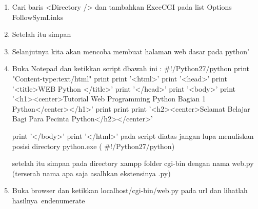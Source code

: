 \begin{enumerate}
\begin{enumerate}
	\item Cari baris <Directory /> dan tambahkan ExecCGI pada list Options FollowSymLinks  
	\item Setelah itu simpan 
	\item Selanjutnya kita akan mencoba membuat halaman web dasar pada python’ 
	\item Buka Notepad dan ketikkan script dbawah ini : 
	$  \#  $!/Python27/python 
	print "Content-type:text/html"
	print 
	print '<html>' 
	print '<head>' 
	print '<title>WEB Python </title>' 
	print '</head>' 
	print '<body>' 
	print '<h1><center>Tutorial Web Programming Python Bagian 1 Python</center></h1>' 
	print 
	print 
	print '<h2><center>Selamat Belajar Bagi Para Pecinta Python</h2></center>' 
	
	print '</body>' 
	print '</html>' 
	pada script diatas jangan lupa menuliskan posisi directory python.exe ( $  \#  $!/Python27/python) 
	
	setelah itu simpan pada directory xampp folder cgi-bin dengan nama web.py (terserah nama apa saja asalhkan ekstensinya .py) 
	
	\item Buka browser dan ketikkan localhost/cgi-bin/web.py pada url dan lihatlah hasilnya\
end{enumerate}


\end{enumerate}
\end{enumerate}
